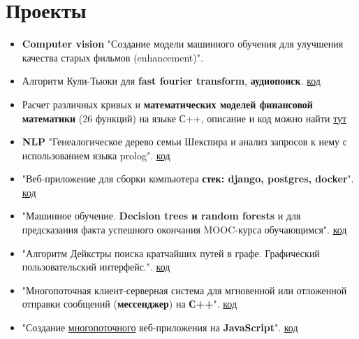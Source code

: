 \documentclass[a4paper,12pt]{article}
\begin{document}
\section{Проекты}
\begin{itemize}
    \item \textbf{Computer vision} "Создание модели машинного обучения для улучшения качества старых фильмов (enhancement)".

    \item Алгоритм Кули-Тьюки для \textbf{fast fourier transform}, \textbf{аудиопоиск}. \href{https://github.com/Suraba03/DA_MAI/tree/main/CP}{код}
    
    \item Расчет различных кривых и \textbf{математических моделей финансовой математики} (26 функций) на языке С++, описание и код можно найти \href{https://github.com/Suraba03/quantaton-2022-preparation}{тут}

    \item \textbf{NLP} "Генеалогическое дерево семьи Шекспира и анализ запросов к нему с использованием языка prolog". \href{https://github.com/Suraba03/LP/tree/main/cp}{код}

    \item "Веб-приложение для сборки компьютера \textbf{стек: django, postgres, docker}". \href{https://github.com/Leha-Slava-Max-Kirill/computer_workshop}{код}
    
    \item "Машинное обучение. \textbf{Decision trees и random forests} и  для предсказания факта успешного окончания MOOC-курса обучающимся". \href{https://github.com/Suraba03/mini_ML_project_sem1}{код}
    
    \item "Алгоритм Дейкстры поиска кратчайших путей в графе. Графический пользовательский интерфейс.". \href{https://github.com/Suraba03/mai_prooga_sem2/tree/main/cp_dm_Dijkstra}{код}
    
    \item "Многопоточная клиент-серверная система для мгновенной или отложенной отправки сообщений (\textbf{мессенджер}) на \textbf{С++}". \href{https://github.com/Suraba03/OS_MAI/tree/main/cp}{код}

    \item "Создание \underline{многопоточного} веб-приложения на \textbf{JavaScript}". \href{https://github.com/Leha-Slava-Max-Kirill/application}{код}

\end{itemize}
\end{document}
